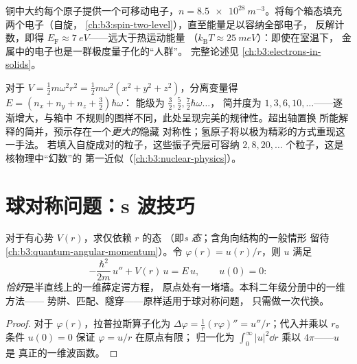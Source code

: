 \begin{example}[金属，初步估算]\label{ex:b3:schrodinger-three-dimensions:metal}
铜中大约每个原子提供一个可移动电子，$n =
\qty{8.5e28}{m^{-3}}$。将每个箱态填充两个电子（自旋，
\cref{ch:b3:spin-two-level}），直至能量足以容纳全部电子，
反解计数，即得 $E_{\text{F}}
\approx \qty{7}{eV}$——远大于热运动能量
（$k_{\text{B}}T \approx \qty{25}{meV}$）：即使在室温下，
金属中的电子也是一群极度量子化的“人群”。
完整论述见 \cref{ch:b3:electrons-in-solids}。
\end{example}

\begin{example}[各向同性振子]\label{ex:b3:schrodinger-three-dimensions:oscillator}
对于 $V = \tfrac12 m\omega^2r^2 = \tfrac12 m\omega^2(x^2 + y^2 +
z^2)$，分离变量得 $E = (n_x + n_y + n_z + \tfrac32)\hbar\omega$：
能级为 $\tfrac32, \tfrac52, \tfrac72\hbar\omega\ldots$，
简并度为 $1, 3, 6, 10, \dots$——逐渐增大，与箱中
不规则的图样不同，此处呈现完美的规律性。超出轴置换
所能解释的简并，预示存在一个\emph{更大的}隐藏
对称性；氢原子将以极为精彩的方式重现这一手法。
若填入自旋成对的粒子，这些振子壳层可容纳 $2,
8, 20, \dots$ 个粒子，这是核物理中“幻数”的
第一近似（\cref{ch:b3:nuclear-physics}）。
\end{example}

\section{球对称问题：s 波技巧}

\begin{proposition}[球对称态]\label{prop:b3:schrodinger-three-dimensions:swave}
对于有心势 $V(r)$，求仅依赖 $r$ 的态
（即\emph{s 态}；含角向结构的一般情形
留待 \cref{ch:b3:quantum-angular-momentum}）。令
$\varphi(r) = u(r)/r$，则 $u$ 满足
\[
-\frac{\hbar^2}{2m}\,u'' + V(r)\,u = E\,u ,
\qquad u(0) = 0 :
\]
\emph{恰好}是半直线上的一维薛定谔方程，
原点处有一堵墙。本科二年级分册中的一维方法——
势阱、匹配、隧穿——原样适用于球对称问题，
只需做一次代换。
\end{proposition}

\begin{proof}
对于 $\varphi(r)$，拉普拉斯算子化为 $\Delta\varphi =
\tfrac1r(r\varphi)'' = u''/r$；代入并乘以 $r$。
条件 $u(0) = 0$ 保证 $\varphi = u/r$ 在原点有限；
归一化为 $\int_0^\infty|u|^2\dd r$ 乘以 $4\pi$——$u$ 是
真正的一维波函数。
\end{proof}


